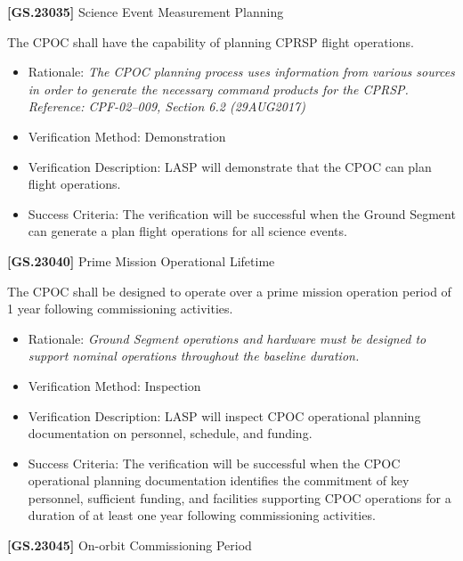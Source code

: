 \textbf{[GS.23035]} Science Event Measurement Planning

The \gls{CPOC} shall have the capability of planning \gls{CPRSP} flight operations.

\begin{itemize}
\item{} Rationale: \emph{The CPOC planning process uses information from various sources in order to generate the necessary command products for the CPRSP. Reference: CPF-02--009, Section 6.2 (29AUG2017)}

\item{} Verification Method: Demonstration

\item{} Verification Description: \gls{LASP} will demonstrate that the \gls{CPOC} can plan flight operations.

\item{} Success Criteria: The verification will be successful when the Ground Segment can generate a plan flight operations for all science events.

\end{itemize}

\textbf{[GS.23040]} Prime Mission Operational Lifetime

The \gls{CPOC} shall be designed to operate over a prime mission operation period of 1 year following commissioning activities.

\begin{itemize}
\item{} Rationale: \emph{Ground Segment operations and hardware must be designed to support nominal operations throughout the baseline duration.}

\item{} Verification Method: Inspection

\item{} Verification Description: \gls{LASP} will inspect \gls{CPOC} operational planning documentation on personnel, schedule, and funding.

\item{} Success Criteria: The verification will be successful when the \gls{CPOC} operational planning documentation identifies the commitment of key personnel, sufficient funding, and facilities supporting \gls{CPOC} operations for a duration of at least one year following commissioning activities.

\end{itemize}

\textbf{[GS.23045]} On-orbit Commissioning Period

